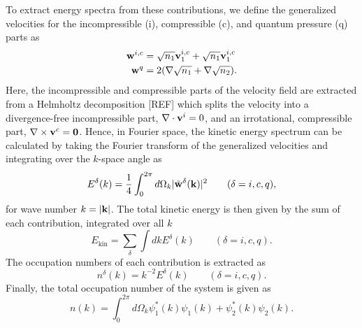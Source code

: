 To extract energy spectra from these contributions, we define the generalized
velocities for the incompressible (i), compressible (c), and quantum pressure
(q) parts as
\begin{equation}
    \begin{aligned}
        \vb{w}^{i, c} &= \sqrt{n_1}\vb{v}_1^{i, c} + \sqrt{n_1}\vb{v}_1^{i, c}
        \\
        \vb{w}^q &= 2 (\nabla \sqrt{n_1} + \nabla \sqrt{n_2}).
    \end{aligned}
\end{equation}
Here, the incompressible and compressible parts of the velocity field are
extracted from a Helmholtz decomposition [REF] which splits the velocity into a 
divergence-free incompressible part, $\nabla \cdot \vb{v}^i = 0$, and an 
irrotational, compressible part, $\nabla \times \vb{v}^c=\vb{0}$.
Hence, in Fourier space, the kinetic energy spectrum can be calculated by
taking the Fourier transform of the generalized velocities and integrating over
the $k$-space angle as
\begin{equation}
    E^\delta(k) = \frac{1}{4} \int_{0}^{2\pi} d\Omega_k
    |\tilde{\vb{w}}^\delta(\vb{k})|^2
    \qquad (\delta = i, c, q),
\end{equation}
for wave number $k=|\vb{k}|$.
The total kinetic energy is then given by the sum of each contribution,
integrated over all $k$
\begin{equation}
    E_\mathrm{kin} = \sum_\delta \int dk E^\delta (k) \qquad (\delta = i, c, q).
\end{equation}
The occupation numbers of each contribution is extracted as
\begin{equation}
    n^\delta(k) = k^{-2}E^\delta(k) \qquad (\delta = i, c, q).
\end{equation}
Finally, the total occupation number of the system is given as
\begin{equation}
    n(k) = \int_{0}^{2\pi} d\Omega_k \psi_1^*(k)\psi_1(k) 
    + \psi_2^*(k)\psi_2(k).
\end{equation}

